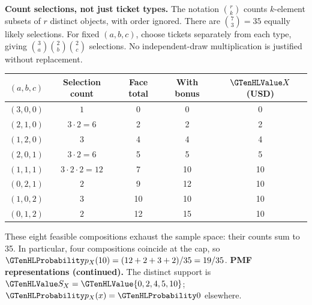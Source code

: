 \textbf{Count selections, not just ticket types.} The notation $\binom{r}{k}$ counts $k$-element subsets of $r$ distinct objects, with order ignored. There are $\binom{7}{3}=35$ equally likely selections. For fixed $(a,b,c)$, choose tickets separately from each type, giving $\binom{3}{a}\binom{2}{b}\binom{2}{c}$ selections. No independent-draw multiplication is justified without replacement.
\begin{center}\begin{tabular}{ccccc}\toprule
$(a,b,c)$ & Selection count & Face total & With bonus & $\cTwoValue{X}$ (USD) \\\midrule
$(3,0,0)$ & $1$ & 0 & 0 & 0 \\
$(2,1,0)$ & $3\cdot2=6$ & 2 & 2 & 2 \\
$(1,2,0)$ & $3$ & 4 & 4 & 4 \\
$(2,0,1)$ & $3\cdot2=6$ & 5 & 5 & 5 \\
$(1,1,1)$ & $3\cdot2\cdot2=12$ & 7 & 10 & 10 \\
$(0,2,1)$ & $2$ & 9 & 12 & 10 \\
$(1,0,2)$ & $3$ & 10 & 10 & 10 \\
$(0,1,2)$ & $2$ & 12 & 15 & 10 \\\bottomrule
\end{tabular}\end{center}
These eight feasible compositions exhaust the sample space: their counts sum to 35. In particular, four compositions coincide at the cap, so $\cTwoMassHL{p_X(10)}=(12+2+3+2)/35=19/35$.
\clearpage
\textbf{PMF representations (continued).} The distinct support is $\cTwoValue{S_X}=\cTwoValue{\{0,2,4,5,10\}}$; $\cTwoMassHL{p_X(x)}=\cTwoMassHL{0}$ elsewhere.
